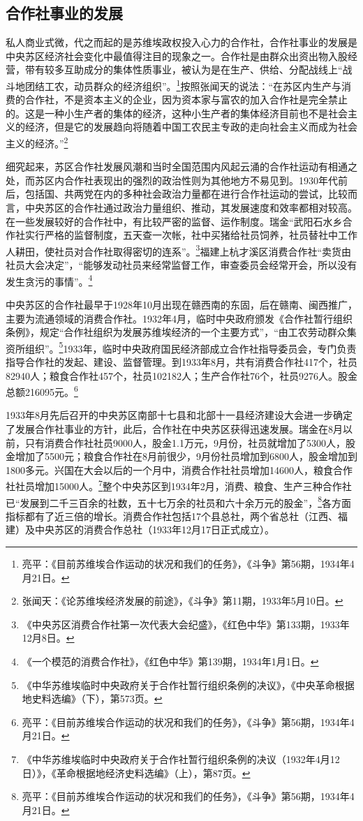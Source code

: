 \subsection{合作社事业的发展}


私人商业式微，代之而起的是苏维埃政权投入心力的合作社，合作社事业的发展是中央苏区经济社会变化中最值得注目的现象之一。合作社是由群众出资出物入股经营，带有较多互助成分的集体性质事业，被认为是在生产、供给、分配战线上“战斗地团结工农，动员群众的经济组织”。\footnote{亮平：《目前苏维埃合作运动的状况和我们的任务》，《斗争》第56期，1934年4月21日。}按照张闻天的说法：“在苏区内生产与消费的合作社，不是资本主义的企业，因为资本家与富农的加入合作社是完全禁止的。这是一种小生产者的集体的经济，这种小生产者的集体经济目前也不是社会主义的经济，但是它的发展趋向将随着中国工农民主专政的走向社会主义而成为社会主义的经济。”\footnote{张闻天：《论苏维埃经济发展的前途》，《斗争》第11期，1933年5月10日。}


细究起来，苏区合作社发展风潮和当时全国范围内风起云涌的合作社运动有相通之处，而苏区内合作社表现出的强烈的政治性则为其他地方不易见到。1930年代前后，包括国、共两党在内的多种社会政治力量都在进行合作社运动的尝试，比较而言，中央苏区的合作社通过政治力量组织、推动，其发展速度和效率都相对较高。在一些发展较好的合作社中，有比较严密的监督、运作制度。瑞金“武阳石水乡合作社实行严格的监督制度，五天查一次帐，社中买猪给社员饲养，社员替社中工作人耕田，使社员对合作社取得密切的连系”。\footnote{《中央苏区消费合作社第一次代表大会纪盛》，《红色中华》第133期，1933年12月8日。}福建上杭才溪区消费合作社“卖货由社员大会决定”，“能够发动社员来经常监督工作，审查委员会经常开会，所以没有发生贪污的事情”。\footnote{《一个模范的消费合作社》，《红色中华》第139期，1934年1月1日。}


中央苏区的合作社最早于1928年10月出现在赣西南的东固，后在赣南、闽西推广，主要为流通领域的消费合作社。1932年4月，临时中央政府颁发《合作社暂行组织条例》，规定“合作社组织为发展苏维埃经济的一个主要方式”，“由工农劳动群众集资所组织”。\footnote{《中华苏维埃临时中央政府关于合作社暂行组织条例的决议》，《中央革命根据地史料选编》（下），第573页。}1933年，临时中央政府国民经济部成立合作社指导委员会，专门负责指导合作社的发起、建设、监督管理。到1933年8月，共有消费合作社417个，社员82940人；粮食合作社457个，社员102182人；生产合作社76个，社员9276人。股金总额216095元。\footnote{亮平：《目前苏维埃合作运动的状况和我们的任务》，《斗争》第56期，1934年4月21日。}


1933年8月先后召开的中央苏区南部十七县和北部十一县经济建设大会进一步确定了发展合作社事业的方针，此后，合作社在中央苏区获得迅速发展。瑞金在8月以前，只有消费合作社社员9000人，股金1.1万元，9月份，社员就增加了5300人，股金增加了5500元；粮食合作社在8月前很少，9月份社员增加到6800人，股金增加到1800多元。兴国在大会以后的一个月中，消费合作社社员增加14600人，粮食合作社社员增加15000人。\footnote{《中华苏维埃临时中央政府关于合作社暂行组织条例的决议（1932年4月12日）》，《革命根据地经济史料选编》（上），第87页。}整个中央苏区到1934年2月，消费、粮食、生产三种合作社已“发展到二千三百余的社数，五十七万余的社员和六十余万元的股金”，\footnote{亮平：《目前苏维埃合作运动的状况和我们的任务》，《斗争》第56期，1934年4月21日。}各方面指标都有了近三倍的增长。消费合作社包括17个县总社，两个省总社（江西、福建）及中央苏区的消费合作总社（1933年12月17日正式成立）。


